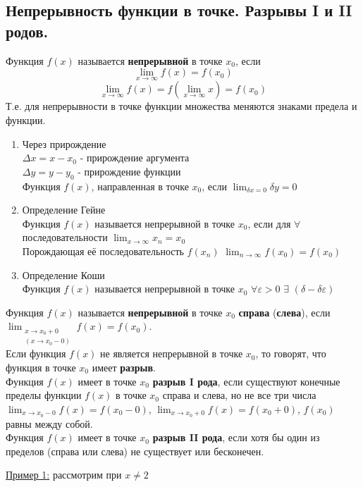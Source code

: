 \documentclass[12pt]{article}
\begin{document}
    \subsection{Непрерывность функции в точке. Разрывы I и II родов.}
    \noindent Функция $f(x)$ называется \textbf{непрерывной} в точке $x_0$, если 
    \[\lim_{x\to\infty}f(x) = f(x_0)\]
    \[\lim_{x\to\infty}f(x) = f(\lim_{x\to\infty}x) = f(x_0)\]
    \noindent Т.е. для непрерывности в точке функции множества меняются знаками предела и функции.
    \begin{enumerate}
        \item Через прирождение\\
        $\varDelta x = x - x_0$ - прирождение аргумента\\
        $\varDelta y = y - y_0$ - прирождение функции\\
        Функция $f(x)$, направленная в точке $x_0$, если $\lim_{\delta x = 0} \delta y = 0$
        \item Определение Гейне\\
        Функция $f(x)$ называется непрерывной в точке $x_0$, если для $\forall$ последовательности $\lim_{x\to\infty} x_n = x_0$\\
        Порождающая её последовательность $f(x_n)$ $\lim_{n\to\infty} f(x_0) = f(x_0)$
        \item Определение Коши\\
        Функция $f(x)$ называется непрерывной в точке $x_0$ $\forall \varepsilon > 0$ $\exists$ $(\delta - \delta \varepsilon)$
    \end{enumerate}
    Функция $f(x)$ называется \textbf{непрерывной} в точке $x_0$ \textbf{справа} (\textbf{слева}), если $\lim_{\substack{x \to x_0 + 0\\(x \to x_0 - 0)}} f(x) = f(x_0)$.\\
    Если функция $f(x)$ не является непрерывной в точке $x_0$, то говорят, что функция в точке $x_0$ имеет \textbf{разрыв}.\\
    Функция $f(x)$ имеет в точке $x_0$ \textbf{разрыв I рода}, если существуют конечные пределы функции $f(x)$ в точке $x_0$ справа и слева, но не все три числа $\lim_{x \to x_0 - 0}f(x) = f(x_0 - 0)$, $\lim_{x \to x_0 + 0}f(x) = f(x_0 + 0)$, $f(x_0)$ равны между собой.\\
    Функция $f(x)$ имеет в точке $x_0$ \textbf{разрыв II рода}, если хотя бы один из пределов (справа или слева) не существует или бесконечен.\par\noindent
    \underline{Пример 1:} рассмотрим при $x \ne 2$
\end{document}
